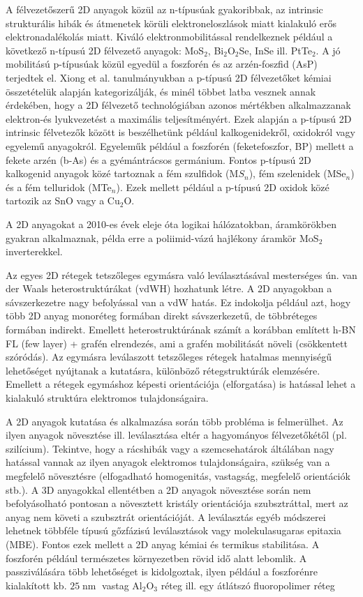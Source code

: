 \documentclass[twoside]{article}
\DeclareMathOperator\nm{nm}
\begin{document}
A félvezetőszerű 2D anyagok közül az n-típusúak gyakoribbak, az intrinsic strukturális hibák és átmenetek körüli elektroneloszlások miatt kialakuló erős elektronadalékolás miatt\cite{xiong2023}. Kiváló elektronmobilitással rendelkeznek például a következő n-típusú 2D félvezető anyagok: MoS$_2$, Bi$_2$O$_2$Se, InSe ill. PtTe$_2$. A jó mobilitású p-típusúak közül egyedül a foszforén és az arzén-foszfid (AsP) terjedtek el. Xiong et al. tanulmányukban a p-típusú 2D félvezetőket kémiai összetételük alapján kategorizálják, és minél többet latba vesznek annak érdekében, hogy a 2D félvezető technológiában azonos mértékben alkalmazzanak elektron-és lyukvezetést a maximális teljesítményért. Ezek alapján a p-típusú 2D intrinsic félvetezők között is beszélhetünk például kalkogenidekről, oxidokról vagy egyelemű anyagokról. Egyeleműk például a foszforén (feketefoszfor, BP) mellett a fekete arzén (b-As) és a gyémántrácsos germánium. Fontos p-típusú 2D kalkogenid anyagok közé tartoznak a fém szulfidok (M$S_n$), fém szelenidek (MSe$_n$) és a fém telluridok (MTe$_n$). Ezek mellett például a p-típusú 2D oxidok közé tartozik az SnO vagy a Cu$_2$O.
\par
A 2D anyagokat a 2010-es évek eleje óta logikai hálózatokban, áramkörökben gyakran alkalmaznak, példa erre a poliimid-vázú hajlékony áramkör MoS$_2$ inverterekkel.\cite{nichols2016}\par\smallskip
Az egyes 2D rétegek tetszőleges egymásra való leválasztásával mesterséges ún. van der Waals heterostruktúrákat (vdWH) hozhatunk létre. A 2D anyagokban a sávszerkezetre nagy befolyással van a vdW hatás. Ez indokolja például azt, hogy több 2D anyag monoréteg formában direkt sávszerkezetű, de többréteges formában indirekt. Emellett heterostruktúrának számít a korábban említett h-BN FL (few layer) + grafén elrendezés, ami a grafén mobilitását növeli (csökkentett szóródás). Az egymásra leválaszott tetszőleges rétegek hatalmas mennyiségű lehetőséget nyújtanak a kutatásra, különböző rétegstruktúrák elemzésére. Emellett a rétegek egymáshoz képesti orientációja (elforgatása) is hatással lehet a kialakuló struktúra elektromos tulajdonságaira. \par
A 2D anyagok kutatása és alkalmazása során több probléma is felmerülhet. Az ilyen anyagok növesztése ill. leválasztása eltér a hagyományos félvezetőkétől (pl. szilícium). Tekintve, hogy a rácshibák vagy a szemcsehatárok áltálában nagy hatással vannak az ilyen anyagok elektromos tulajdonságaira\cite{ly2016}, szükség van a megfelelő növesztésre (elfogadható homogenitás, vastagság, megfelelő orientációk stb.). A 3D anyagokkal ellentétben a 2D anyagok növesztése során nem befolyásolható pontosan a növesztett kristály orientációja szubsztráttal, mert az anyag nem követi a szubsztrát orientációját\cite{li2019}. A leválasztás egyéb módszerei lehetnek többféle típusú gőzfázisú leválasztások vagy molekulasugaras epitaxia (MBE). Fontos ezek mellett a 2D anyag kémiai és termikus stabilitása. A foszforén például természetes környezetben rövid idő alatt lebomlik\cite{nichols2016}\cite{pei2016}. A passziválására több lehetőséget is kidolgoztak, ilyen például a foszforénre kialakított kb. $25 \nm$ vastag Al$_2$O$_3$ réteg ill. egy átlátszó fluoropolimer réteg\cite{kim2015}\par
\end{document}
